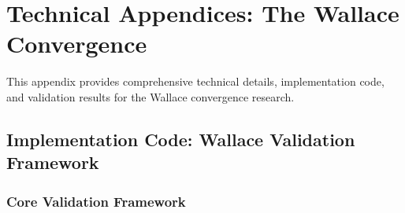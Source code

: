 \section{Technical Appendices: The Wallace Convergence}
\label{sec:technical_appendices}

This appendix provides comprehensive technical details, implementation code, and validation results for the Wallace convergence research.

\subsection{Implementation Code: Wallace Validation Framework}

\subsubsection{Core Validation Framework}

